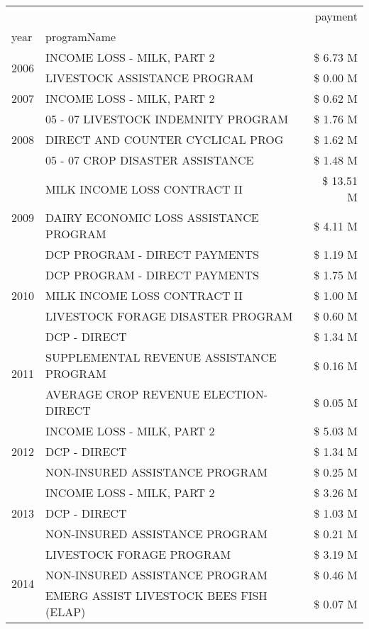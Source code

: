 \begin{tabular}{llr}
\toprule
 &  & payment \\
year & programName &  \\
\midrule
\multirow[t]{2}{*}{2006} & INCOME LOSS - MILK, PART 2 & \$ 6.73 M \\
 & LIVESTOCK ASSISTANCE PROGRAM & \$ 0.00 M \\
\cline{1-3}
2007 & INCOME LOSS - MILK, PART 2 & \$ 0.62 M \\
\cline{1-3}
\multirow[t]{3}{*}{2008} & 05 - 07 LIVESTOCK INDEMNITY PROGRAM & \$ 1.76 M \\
 & DIRECT AND COUNTER CYCLICAL PROG & \$ 1.62 M \\
 & 05 - 07 CROP DISASTER ASSISTANCE & \$ 1.48 M \\
\cline{1-3}
\multirow[t]{3}{*}{2009} & MILK INCOME LOSS CONTRACT II & \$ 13.51 M \\
 & DAIRY ECONOMIC LOSS ASSISTANCE PROGRAM & \$ 4.11 M \\
 & DCP PROGRAM - DIRECT PAYMENTS & \$ 1.19 M \\
\cline{1-3}
\multirow[t]{3}{*}{2010} & DCP PROGRAM - DIRECT PAYMENTS & \$ 1.75 M \\
 & MILK INCOME LOSS CONTRACT II & \$ 1.00 M \\
 & LIVESTOCK FORAGE DISASTER  PROGRAM & \$ 0.60 M \\
\cline{1-3}
\multirow[t]{3}{*}{2011} & DCP - DIRECT & \$ 1.34 M \\
 & SUPPLEMENTAL REVENUE ASSISTANCE PROGRAM & \$ 0.16 M \\
 & AVERAGE CROP REVENUE ELECTION-DIRECT & \$ 0.05 M \\
\cline{1-3}
\multirow[t]{3}{*}{2012} & INCOME LOSS - MILK, PART 2 & \$ 5.03 M \\
 & DCP - DIRECT & \$ 1.34 M \\
 & NON-INSURED ASSISTANCE PROGRAM & \$ 0.25 M \\
\cline{1-3}
\multirow[t]{3}{*}{2013} & INCOME LOSS - MILK, PART 2 & \$ 3.26 M \\
 & DCP - DIRECT & \$ 1.03 M \\
 & NON-INSURED ASSISTANCE PROGRAM & \$ 0.21 M \\
\cline{1-3}
\multirow[t]{3}{*}{2014} & LIVESTOCK FORAGE PROGRAM & \$ 3.19 M \\
 & NON-INSURED ASSISTANCE PROGRAM & \$ 0.46 M \\
 & EMERG ASSIST LIVESTOCK BEES FISH (ELAP) & \$ 0.07 M \\
\cline{1-3}

\end{tabular}
